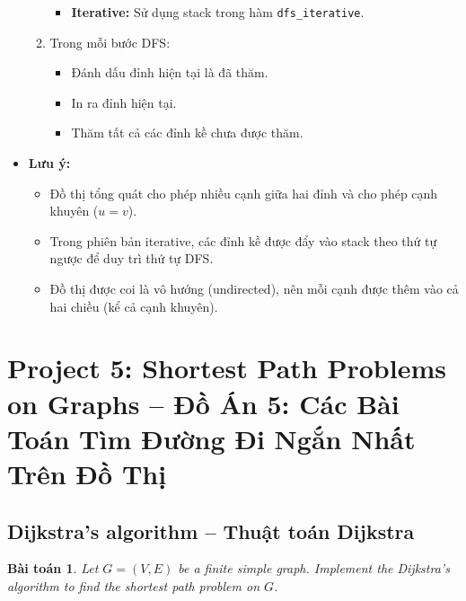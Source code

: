 \documentclass{article}
\newtheorem{baitoan}{Bài toán}
\begin{document}
\begin{itemize}
\begin{enumerate}
\begin{itemize}
\begin{itemize}
\begin{enumerate}
                \end{enumerate}
            \end{itemize}
            \item \textbf{Iterative:} Sử dụng stack trong hàm \texttt{dfs\_iterative}.
        \end{itemize}
        \item Trong mỗi bước DFS:
        \begin{itemize}
            \item Đánh dấu đỉnh hiện tại là đã thăm.
            \item In ra đỉnh hiện tại.
            \item Thăm tất cả các đỉnh kề chưa được thăm.
        \end{itemize}
    \end{enumerate}
    \item \textbf{Lưu ý:} 
    \begin{itemize}
        \item Đồ thị tổng quát cho phép nhiều cạnh giữa hai đỉnh và cho phép cạnh khuyên ($u = v$).
        \item Trong phiên bản iterative, các đỉnh kề được đẩy vào stack theo thứ tự ngược để duy trì thứ tự DFS.
        \item Đồ thị được coi là vô hướng (undirected), nên mỗi cạnh được thêm vào cả hai chiều (kể cả cạnh khuyên).
    \end{itemize}
\end{itemize}


\section{Project 5: Shortest Path Problems on Graphs -- Đồ Án 5: Các Bài Toán Tìm Đường Đi Ngắn Nhất Trên Đồ Thị}


\subsection{Dijkstra's algorithm -- Thuật toán Dijkstra}

\begin{baitoan}
    Let $G = (V,E)$ be a finite simple graph. Implement the Dijkstra's algorithm to find the shortest path problem on $G$.
\end{baitoan}
\end{document}
